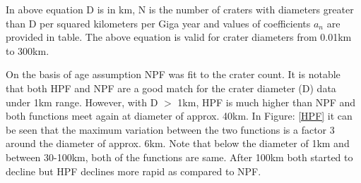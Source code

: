 \documentclass[11pt]{article}
\begin{document}
In above equation D is in km, N is the number of craters with diameters greater than D per squared kilometers per Giga year and values of coefficients $a_n$ are provided in table. The above equation is valid for crater diameters from 0.01km to 300km.

On the basis of age assumption NPF was fit to the crater count. It is notable that both HPF and NPF are a good match for the crater diameter (D) data under 1km range. However, with D $>$ 1km, HPF is much higher than NPF and both functions meet again at diameter of approx. 40km. In Figure: \ref{HPF} it can be seen that the maximum variation between the two functions is a factor 3 around the diameter of approx. 6km. Note that below the diameter of 1km and between 30-100km, both of the functions are same. After 100km both started to decline but HPF declines more rapid as compared to NPF.
\end{document}
